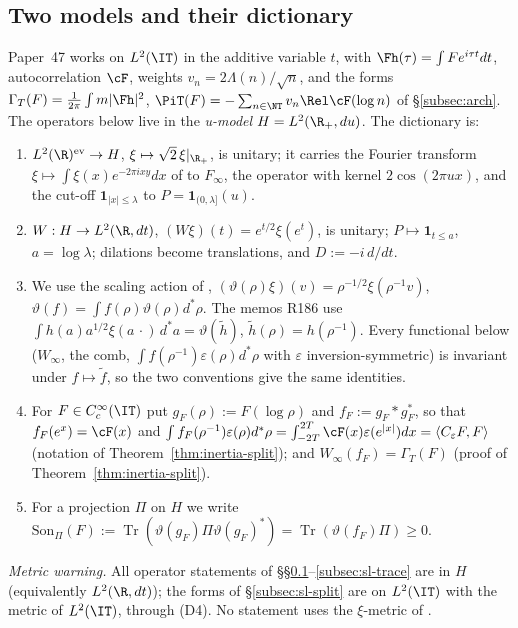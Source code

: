 \subsection{Two models and their dictionary}\label{subsec:sl-dict}
Paper~47 works on $L^2(\IT)$ in the additive variable $t$, with $\Fh(\tau)=\int Fe^{i\tau t}dt$,
autocorrelation $\cF$, weights $v_n=2\Lambda(n)/\sqrt n$, and the forms
$\Gamma_T(F)=\frac1{2\pi}\int m|\Fh|^2$, $\PiT(F)=-\sum_{n\in\NT}v_n\Rel\cF(\log n)$ of
\S\ref{subsec:arch}. The operators below live in the \emph{u-model} $H=L^2(\R_+,du)$. The dictionary is:
\begin{enumerate}
\item[(D1)] $L^2(\R)^{\mathrm{ev}}\to H$, $\xi\mapsto\sqrt2\,\xi|_{\R_+}$, is unitary; it carries the
Fourier transform $\xi\mapsto\int\xi(x)e^{-2\pi ixy}dx$ of \cite{ConnesConsani2021} to $F_\infty$, the
operator with kernel $2\cos(2\pi ux)$, and the cut-off $\mathbf 1_{|x|\le\lambda}$ to
$P=\mathbf 1_{(0,\lambda]}(u)$.
\item[(D2)] $W:H\to L^2(\R,dt)$, $(W\xi)(t)=e^{t/2}\xi(e^t)$, is unitary; $P\mapsto\mathbf 1_{t\le a}$,
$a=\log\lambda$; dilations become translations, and $D:=-i\,d/dt$.
\item[(D3)] We use the scaling action of \cite[(61)]{ConnesConsani2021},
$(\vartheta(\rho)\xi)(v)=\rho^{-1/2}\xi(\rho^{-1}v)$, $\vartheta(f)=\int f(\rho)\vartheta(\rho)d^*\rho$. The memos
R186 use $\int h(a)a^{1/2}\xi(a\,\cdot)\,d^*a=\vartheta(\tilde h)$, $\tilde h(\rho)=h(\rho^{-1})$. Every
functional below ($W_\infty$, the comb, $\int f(\rho^{-1})\varepsilon(\rho)d^*\rho$ with $\varepsilon$
inversion-symmetric) is invariant under $f\mapsto\tilde f$, so the two conventions give the same identities.
\item[(D4)] For $F\in C_c^\infty(\IT)$ put $g_F(\rho):=F(\log\rho)$ and $f_F:=g_F*g_F^*$, so that
$f_F(e^x)=\cF(x)$ and $\int f_F(\rho^{-1})\varepsilon(\rho)d^*\rho=\int_{-2T}^{2T}\cF(x)\varepsilon(e^{|x|})dx
=\langle C_\varepsilon F,F\rangle$ (notation of Theorem~\ref{thm:inertia-split}); and
$W_\infty(f_F)=\Gamma_T(F)$ (proof of Theorem~\ref{thm:inertia-split}).
\item[(D5)] For a projection $\Pi$ on $H$ we write $\mathrm{Son}_\Pi(F):=\operatorname{Tr}(\vartheta(g_F)\Pi\vartheta(g_F)^*)
=\operatorname{Tr}(\vartheta(f_F)\Pi)\ge0$.
\end{enumerate}
\emph{Metric warning.} All operator statements of \S\S\ref{subsec:sl-dict}--\ref{subsec:sl-trace} are in $H$
(equivalently $L^2(\R,dt)$); the forms of \S\ref{subsec:sl-split} are on $L^2(\IT)$ with the metric of
$L^2(\IT)$, through (D4). No statement uses the $\xi$-metric of \cite[\S6]{ConnesConsani2021}.

